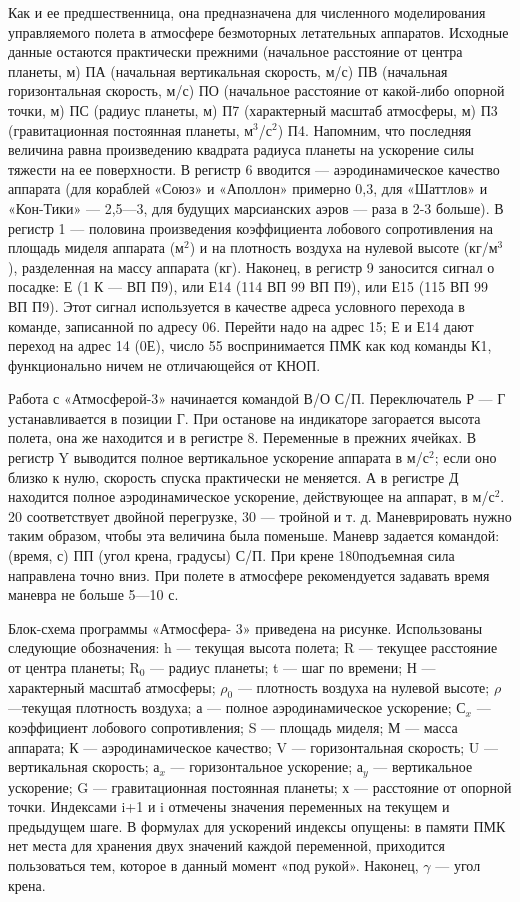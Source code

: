 \documentclass[11pt,a4paper,oneside]{article}
\begin{document}
Как и ее предшественница, она предназначена для численного моделирования управляемого полета в атмосфере безмоторных летательных аппаратов. Исходные данные остаются практически прежними (начальное расстояние от центра планеты, м) ПА (начальная вертикальная скорость, м/с) ПВ (начальная горизонтальная скорость, м/с) ПО (начальное расстояние от какой-либо опорной точки, м) ПС (радиус планеты, м) П7 (характерный масштаб атмосферы, м) П3 (гравитационная постоянная планеты, м$^{3}$/с$^{2}$) П4. Напомним, что последняя величина равна произведению квадрата радиуса планеты на ускорение силы тяжести на ее поверхности. В регистр 6 вводится — аэродинамическое качество аппарата (для кораблей «Союз» и «Аполлон» примерно 0,3, для «Шаттлов» и «Кон-Тики» — 2,5—3, для будущих марсианских аэров — раза в 2-3 больше). В регистр 1 — половина произведения коэффициента лобового сопротивления на площадь миделя аппарата (м$^{2}$) и на плотность воздуха на нулевой высоте (кг/м$^{3}$), разделенная на массу аппарата (кг). Наконец, в регистр 9 заносится сигнал о посадке: Е (1 К — ВП П9), или Е14 (114 ВП 99 ВП П9), или Е15 (115 ВП 99 ВП П9). Этот сигнал используется в качестве адреса условного перехода в команде, записанной по адресу 06. Перейти надо на адрес 15; Е и Е14 дают переход на адрес 14 (0Е), число 55 воспринимается ПМК как код команды К1, функционально ничем не отличающейся от КНОП.

Работа с «Атмосферой-3» начинается командой В/О С/П. Переключатель Р — Г устанавливается в позиции Г. При останове на индикаторе загорается высота полета, она же находится и в регистре 8. Переменные в прежних ячейках. В регистр Y выводится полное вертикальное ускорение аппарата в м/с$^{2}$; если оно близко к нулю, скорость спуска практически не меняется. А в регистре Д находится полное аэродинамическое ускорение, действующее на аппарат, в м/с$^{2}$. 20 соответствует двойной перегрузке, 30 — тройной и т. д. Маневрировать нужно таким образом, чтобы эта величина была поменьше. Маневр задается командой: (время, с) ПП (угол крена, градусы) С/П. При крене 180\degree подъемная сила направлена точно вниз. При полете в атмосфере рекомендуется задавать время маневра не больше 5—10 с.

Блок-схема программы «Атмосфера- 3» приведена на рисунке. Использованы следующие обозначения: h — текущая высота полета; R — текущее расстояние от центра планеты; R$_{0}$ — радиус планеты; t — шаг по времени; Н — характерный масштаб атмосферы; $\rho_{0}$ — плотность воздуха на нулевой высоте; $\rho$—текущая плотность воздуха; а — полное аэродинамическое ускорение; С$_{x}$ — коэффициент лобового сопротивления; S — площадь миделя; М — масса аппарата; К — аэродинамическое качество; V — горизонтальная скорость; U — вертикальная скорость; а$_{x}$ — горизонтальное ускорение; а$_{y}$ — вертикальное ускорение; G — гравитационная постоянная планеты; х — расстояние от опорной точки. Индексами i+1 и i отмечены значения переменных на текущем и предыдущем шаге. В формулах для ускорений индексы опущены: в памяти ПМК нет места для хранения двух значений каждой переменной, приходится пользоваться тем, которое в данный момент «под рукой». Наконец, $\gamma$ — угол крена.
\end{document}
